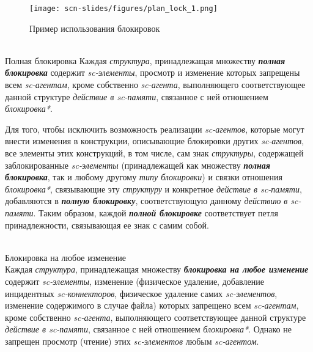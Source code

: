 \newpage
\begin{figure}
    \centering
    \caption{Пример использования блокировок}
	\texttt{[image: scn-slides/figures/plan\_lock\_1.png]}
\end{figure}
    


\begin{frame}{\\Полная блокировка}
\topline
\vspace{30pt}
Каждая \textit{структура}, принадлежащая множеству \textbf{\textit{полная блокировка}} содержит \textit{sc-элементы}, просмотр и изменение которых запрещены всем \textit{sc-агентам}, кроме собственно \textit{sc-агента}, выполняющего соответствующее данной структуре \textit{действие в sc-памяти}, связанное с ней отношением \textit{блокировка*}.

Для того, чтобы исключить возможность реализации \textit{sc-агентов}, которые могут внести изменения в конструкции, описывающие блокировки других \textit{sc-агентов}, все элементы этих конструкций, в том числе, сам знак \textit{структуры}, содержащей заблокированные \textit{sc-элементы} (принадлежащей как множеству \textbf{\textit{полная блокировка}}, так и любому другому \textit{типу блокировки}) и связки отношения \textit{блокировка*}, связывающие эту \textit{структуру} и конкретное \textit{действие в sc-памяти}, добавляются в \textbf{\textit{полную блокировку}}, соответствующую данному \textit{действию в sc-памяти}. Таким образом, каждой \textbf{\textit{полной блокировке}} соответствует петля принадлежности, связывающая ее знак с самим собой. 
\end{frame}

\begin{frame}{\\Блокировка на любое изменение}
\topline
\vspace{15pt}
 \\

  Каждая \textit{структура}, принадлежащая множеству \textbf{\textit{блокировка на любое изменение}} содержит \textit{sc-элементы}, изменение (физическое удаление, добавление инцидентных \textit{sc-коннекторов}, физическое удаление самих \textit{\mbox{sc-элементов}}, изменение содержимого в случае файла) которых запрещено всем \textit{sc-агентам}, кроме собственно \textit{sc-агента}, выполняющего соответствующее данной структуре \textit{действие в sc-памяти}, связанное с ней отношением \textit{блокировка*}. Однако не запрещен просмотр (чтение) этих \textit{sc-элементов} любым \textit{sc-агентом}.  
\end{frame}

